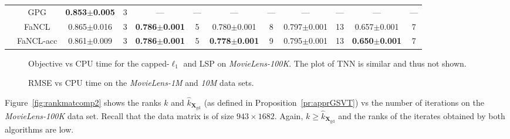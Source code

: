 \documentclass[10pt,journal,compsoc]{IEEEtran}
\newcommand{\X}{\mathbf{X}}
\begin{document}
\begin{table*}[ht]
\begin{tabular}{cc|cc|cc|cc|cc|cc}
	         &    \textsf{GPG}     & \textbf{0.853$\pm$0.005} &         3         &           ---            &       ---       &           ---            &       ---        &           ---            &    ---    &           ---            &   ---   \\ \cline{2-12}
	         &   \textsf{FaNCL}    &     0.865$\pm$0.016      &         3         & \textbf{0.786$\pm$0.001} &        5        &     0.780$\pm$0.001      &        8         &     0.797$\pm$0.001      &    13     &     0.657$\pm$0.001      &    7    \\ \cline{2-12}
	         & \textsf{FaNCL-acc}  &     0.861$\pm$0.009      &         3         & \textbf{0.786$\pm$0.001} &        5        & \textbf{0.778$\pm$0.001} &        9         &     0.795$\pm$0.001      &    13     & \textbf{0.650$\pm$0.001} &    7    \\ \hline
\end{tabular}
\end{table*}

\begin{figure}[ht]
\centering

\vspace{-10px}
\caption{Objective vs CPU time for the capped-$\ell_1$ and LSP on 
\textit{MovieLens-100K}.  The plot of TNN is similar and thus not shown.}
\label{fig:movielen:obj}
\end{figure}

\begin{figure}[ht]
\centering


\vspace{-10px}
\caption{RMSE vs CPU time on the \textit{MovieLens-1M} and \textit{10M} data sets.}
\label{fig:movie:rmse}
\end{figure}

Figure~\ref{fig:rankmatcomp2} shows the ranks $k$ and $\hat{k}_{\X_{\text{gd}}}$ (as defined in Proposition~\ref{pr:apprGSVT}) vs the number of iterations on the \textit{MovieLens-100K} data set.  Recall that the data matrix is of size $943 \times 1682$.  Again, $k \ge \hat{k}_{\X_{\text{gd}}}$ and the ranks of the iterates obtained by both algorithms are low.
\end{document}
